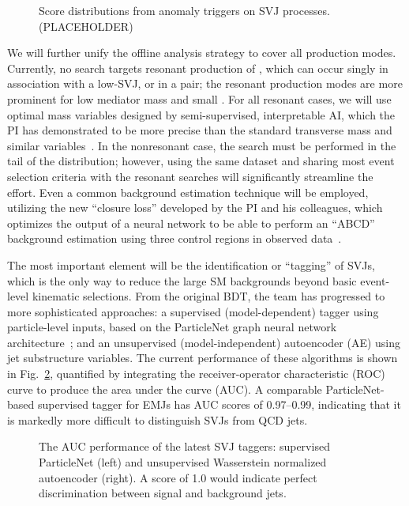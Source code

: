 \begin{figure}[htb!]
\centering
{}
\caption{Score distributions from anomaly triggers on SVJ processes. (PLACEHOLDER)}
\label{fig:svjanomaly}
\end{figure}

We will further unify the offline analysis strategy to cover all production modes.
Currently, no search targets resonant production of \Pbifun, which can occur singly in association with a low-\pt SVJ, or in a pair;
the resonant production modes are more prominent for low mediator mass and small \sbifun.
For all resonant cases, we will use optimal mass variables designed by semi-supervised, interpretable AI, which the PI has demonstrated to be more precise than the standard transverse mass and similar variables~\cite{Pedro:2023sdp}.
In the nonresonant case, the search must be performed in the tail of the \ptmiss distribution;
however, using the same dataset and sharing most event selection criteria with the resonant searches will significantly streamline the effort.
Even a common background estimation technique will be employed, utilizing the new ``closure loss'' developed by the PI and his colleagues,
which optimizes the output of a neural network to be able to perform an ``ABCD'' background estimation using three control regions in observed data~\cite{}.

The most important element will be the identification or ``tagging'' of SVJs, which is the only way to reduce the large SM backgrounds beyond basic event-level kinematic selections.
From the original BDT, the team has progressed to more sophisticated approaches:
a supervised (model-dependent) tagger using particle-level inputs, based on the ParticleNet graph neural network architecture~\cite{Qu:2019gqs};
and an unsupervised (model-independent) autoencoder (AE) using jet substructure variables.
The current performance of these algorithms is shown in Fig.~\ref{fig:svjtaggers}, quantified by integrating the receiver-operator characteristic (ROC) curve to produce the area under the curve (AUC).
A comparable ParticleNet-based supervised tagger for EMJs has AUC scores of 0.97--0.99, indicating that it is markedly more difficult to distinguish SVJs from QCD jets.

\begin{figure}[htb!]
\centering
{}
\caption{The AUC performance of the latest SVJ taggers: supervised ParticleNet (left) and unsupervised Wasserstein normalized autoencoder (right).
A score of 1.0 would indicate perfect discrimination between signal and background jets.}
\label{fig:svjtaggers}
\end{figure}

